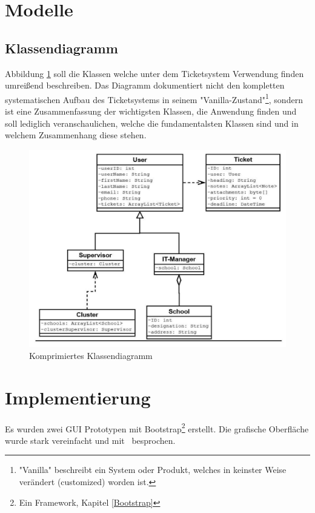 		
	\newpage
	\section{Modelle}
	\subsection{Klassendiagramm}
	Abbildung \ref{Klassendiagramm_System} soll die Klassen welche unter dem Ticketsystem Verwendung finden umreißend beschreiben. Das Diagramm dokumentiert nicht den kompletten systematischen Aufbau des Ticketsystems in seinem "Vanilla-Zustand"\footnote{"Vanilla" beschreibt ein System oder Produkt, welches in keinster Weise verändert (customized) worden ist.}, sondern ist eine Zusammenfassung der wichtigsten Klassen, die Anwendung finden und soll lediglich veranschaulichen, welche die fundamentalsten Klassen sind und in welchem Zusammenhang diese stehen.
	
	
	\begin{figure}[h]
		\centering
		\includegraphics[scale=0.9]{figures/Klassendiagramm.jpg}
		\caption{Komprimiertes Klassendiagramm}
		\label{Klassendiagramm_System}
	\end{figure}
	 \newpage
	
	
	\section{Implementierung}
	Es wurden zwei GUI Prototypen mit Bootstrap\footnote{Ein Framework,  Kapitel \ref{Bootstrap}}  erstellt. Die grafische Oberfläche wurde stark vereinfacht und mit \getHammerl\ besprochen.
